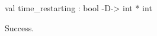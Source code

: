 \chklistingtrue
{}
\begin{ChkListingMsg}
val time_restarting : bool -D-> int * int 
\end{ChkListingMsg}
\begin{ChkListingErr}
Success.
\end{ChkListingErr}
